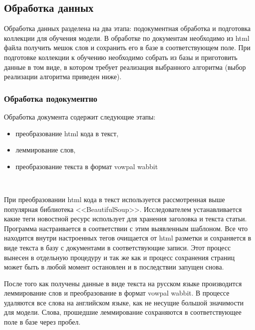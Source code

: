\subsection{Обработка данных}

Обработка данных разделена на два этапа: подокументная обработка и подготовка коллекции для обучения модели. В обработке по документам необходимо из html файла получить мешок слов и сохранить его в базе в соответствующем поле. При подготовке коллекции к обучению необходимо собрать из базы и приготовить данные в том виде, в котором требует реализация выбранного алгоритма (выбор реализации алгоритма приведен ниже).

\subsubsection{Обработка подокументно}

Обработка документа содержит следующие этапы:

\begin{itemize}
    \item преобразование html кода в текст,
    \item леммирование слов,
    \item преобразование текста в формат vowpal wabbit
\end{itemize}
~\

При преобразовании html кода в текст используется рассмотренная выше популярная библиотека <<BeautifulSoup>>. Исследователем устанавливается какие теги новостной ресурс использует для хранения заголовка и текста статьи. Программа настраивается в соответствии с этим выявленным шаблоном. Все что находится внутри настроенных тегов очищается от html разметки и сохраняется в виде текста в базу с документами в соответствующие записи. Этот процесс вынесен в отдельную процедуру и так же как и процесс сохранения страниц может быть в любой момент остановлен и в последствии запущен снова.

После того как получены данные в виде текста на русском языке производится леммирование слов и преобразование в формат vowpal wabbit. В процессе удаляются все слова на английском языке, как не несущие большой значимости для модели. Слова, прошедшие леммирование сохраняются в соответствующее поле в базе через пробел.

